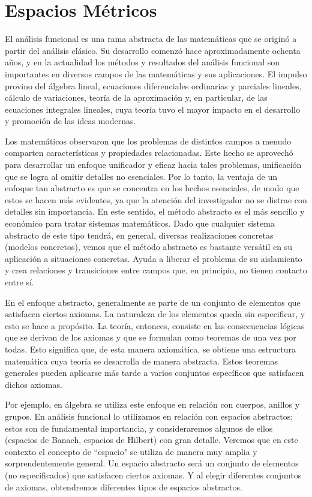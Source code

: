 \chapter{Espacios Métricos} 
{El análisis funcional es una rama abstracta de las matemáticas que se originó a partir del análisis clásico. Su desarrollo comenzó hace aproximadamente ochenta años, y en la actualidad los métodos y resultados del análisis funcional son importantes en diversos campos de las matemáticas y sus aplicaciones. El impulso provino del álgebra lineal, ecuaciones diferenciales ordinarias y parciales lineales, cálculo de variaciones, teoría de la aproximación y, en particular, de las ecuaciones integrales lineales, cuya teoría tuvo el mayor impacto en el desarrollo y promoción de las ideas modernas.

Los matemáticos observaron que los problemas de distintos campos a menudo comparten características y propiedades relacionadas. Este hecho se aprovechó para desarrollar un enfoque unificador y eficaz hacia tales problemas, unificación que se logra al omitir detalles no esenciales. Por lo tanto, la ventaja de un enfoque tan abstracto es que se concentra en los hechos esenciales, de modo que estos se hacen más evidentes, ya que la atención del investigador no se distrae con detalles sin importancia. En este sentido, el método abstracto es el más sencillo y económico para tratar sistemas matemáticos. Dado que cualquier sistema abstracto de este tipo tendrá, en general, diversas realizaciones concretas (modelos concretos), vemos que el método abstracto es bastante versátil en su aplicación a situaciones concretas. Ayuda a liberar el problema de su aislamiento y crea relaciones y transiciones entre campos que, en principio, no tienen contacto entre sí.

En el enfoque abstracto, generalmente se parte de un conjunto de elementos que satisfacen ciertos axiomas. La naturaleza de los elementos queda sin especificar, y esto se hace a propósito. La teoría, entonces, consiste en las consecuencias lógicas que se derivan de los axiomas y que se formulan como teoremas de una vez por todas. Esto significa que, de esta manera axiomática, se obtiene una estructura matemática cuya teoría se desarrolla de manera abstracta. Estos teoremas generales pueden aplicarse más tarde a varios conjuntos específicos que satisfacen dichos axiomas.

Por ejemplo, en álgebra se utiliza este enfoque en relación con cuerpos, anillos y grupos. En análisis funcional lo utilizamos en relación con espacios abstractos; estos son de fundamental importancia, y consideraremos algunos de ellos (espacios de Banach, espacios de Hilbert) con gran detalle. Veremos que en este contexto el concepto de ``espacio" se utiliza de manera muy amplia y sorprendentemente general. Un espacio abstracto será un conjunto de elementos (no especificados) que satisfacen ciertos axiomas. Y al elegir diferentes conjuntos de axiomas, obtendremos diferentes tipos de espacios abstractos.

}
